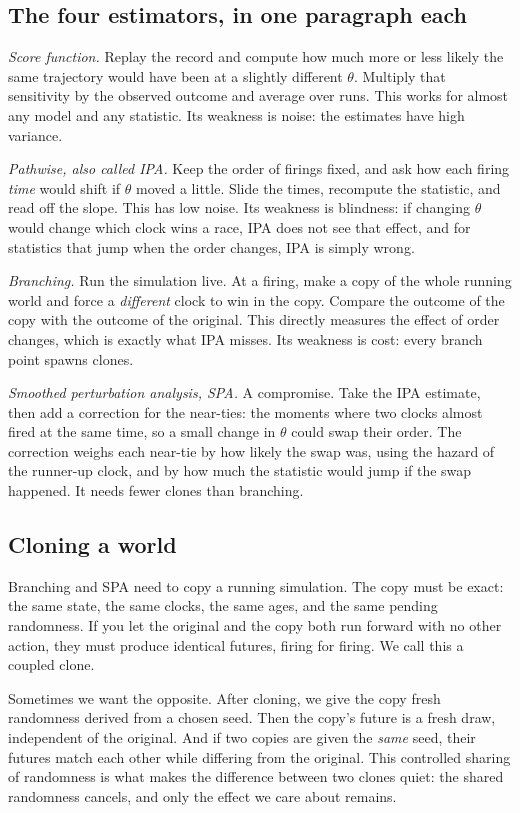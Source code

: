 \documentclass[11pt]{article}
\begin{document}
\subsection{The four estimators, in one paragraph each}

\emph{Score function.} Replay the record and compute how much more or less
likely the same trajectory would have been at a slightly different
$\theta$. Multiply that sensitivity by the observed outcome and average
over runs. This works for almost any model and any statistic. Its weakness
is noise: the estimates have high variance.

\emph{Pathwise, also called IPA.} Keep the order of firings fixed, and ask
how each firing \emph{time} would shift if $\theta$ moved a little. Slide
the times, recompute the statistic, and read off the slope. This has low
noise. Its weakness is blindness: if changing $\theta$ would change which
clock wins a race, IPA does not see that effect, and for statistics that
jump when the order changes, IPA is simply wrong.

\emph{Branching.} Run the simulation live. At a firing, make a copy of the
whole running world and force a \emph{different} clock to win in the copy.
Compare the outcome of the copy with the outcome of the original. This
directly measures the effect of order changes, which is exactly what IPA
misses. Its weakness is cost: every branch point spawns clones.

\emph{Smoothed perturbation analysis, SPA.} A compromise. Take the IPA
estimate, then add a correction for the near-ties: the moments where two
clocks almost fired at the same time, so a small change in $\theta$ could
swap their order. The correction weighs each near-tie by how likely the
swap was, using the hazard of the runner-up clock, and by how much the
statistic would jump if the swap happened. It needs fewer clones than
branching.

\subsection{Cloning a world}

Branching and SPA need to copy a running simulation. The copy must be
exact: the same state, the same clocks, the same ages, and the same
pending randomness. If you let the original and the copy both run forward
with no other action, they must produce identical futures, firing for
firing. We call this a coupled clone.

Sometimes we want the opposite. After cloning, we give the copy fresh
randomness derived from a chosen seed. Then the copy's future is a fresh
draw, independent of the original. And if two copies are given the
\emph{same} seed, their futures match each other while differing from the
original. This controlled sharing of randomness is what makes the
difference between two clones quiet: the shared randomness cancels, and
only the effect we care about remains.
\end{document}
